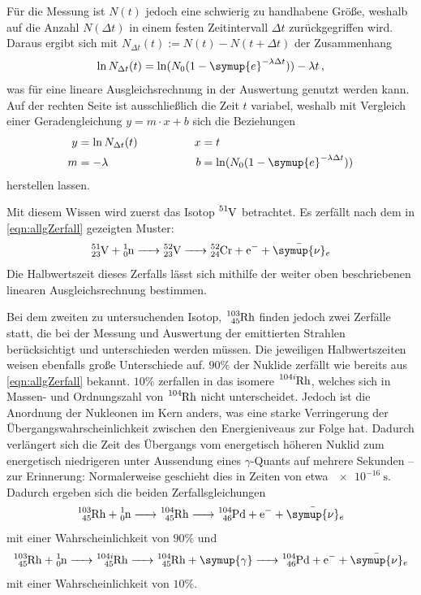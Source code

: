 Für die Messung ist $N(t)$ jedoch eine schwierig zu handhabene Größe, weshalb auf die Anzahl $N(\Delta t)$ in einem festen Zeitintervall $\Delta t$ zurückgegriffen wird. 
Daraus ergibt sich mit ${N_{\Delta t}(t) := N(t)-N(t+\Delta t)}$ der Zusammenhang
\begin{equation}
    \ln N_{\Delta t}(t) = \ln (N_0 (1-\symup{e}^{-\lambda \Delta t})) - \lambda t \,,
    \label{eqn:linRegr}
\end{equation}
was für eine lineare Ausgleichsrechnung in der Auswertung genutzt werden kann. 
Auf der rechten Seite ist ausschließlich die Zeit $t$ variabel, weshalb mit Vergleich einer Geradengleichung $y=m\cdot x +b$ sich die Beziehungen 
\begin{align*}
    y&=\ln N_{\Delta t}(t) &\qquad \qquad x&=t \\
    m&=- \lambda & \qquad \qquad b&=\ln (N_0 (1-\symup{e}^{-\lambda \Delta t}))
\end{align*}
herstellen lassen.

Mit diesem Wissen wird zuerst das Isotop $\ce{^{51}V}$ betrachtet. Es zerfällt nach dem in \eqref{eqn:allgZerfall} gezeigten Muster:
\begin{equation*}
    \ce{^{51}_{23}V + ^1_0n -> ^{52}_{23}V -> ^{52}_{24}Cr + e- + \bar{\symup{\nu}}_e}
\end{equation*}
Die Halbwertszeit dieses Zerfalls lässt sich mithilfe der weiter oben beschriebenen linearen Ausgleichsrechnung bestimmen. 

Bei dem zweiten zu untersuchenden Isotop, $\ce{^{103}_{45}Rh}$ finden jedoch zwei Zerfälle statt, die bei der Messung und 
Auswertung der emittierten Strahlen berücksichtigt und unterschieden werden müssen. Die jeweiligen Halbwertszeiten weisen ebenfalls große Unterschiede auf.  
$90\%$ der Nuklide zerfällt wie bereits aus \eqref{eqn:allgZerfall} bekannt. $10\%$ zerfallen in das isomere $\ce{^{104i}Rh}$, 
welches sich in Massen- und Ordnungszahl von $\ce{^{104}Rh}$ nicht unterscheidet. 
Jedoch ist die Anordnung der Nukleonen im Kern anders, was eine starke Verringerung der Übergangswahrscheinlichkeit zwischen den 
Energieniveaus zur Folge hat. 
Dadurch verlängert sich die Zeit des Übergangs vom energetisch höheren Nuklid zum energetisch niedrigeren unter Aussendung eines 
$\gamma$-Quants auf mehrere Sekunden -- zur Erinnerung: Normalerweise geschieht dies in Zeiten von etwa $\SI{e-16}{\second}$. 
Dadurch ergeben sich die beiden Zerfallsgleichungen
\begin{equation}
    \ce{^{103}_{45}Rh + ^1_0n -> ^{104}_{45}Rh -> ^{104}_{46}Pd + e- + \bar{\symup{\nu}}_e}
\end{equation}
mit einer Wahrscheinlichkeit von $90\%$ und 
\begin{equation}
    \ce{^{103}_{45}Rh + ^1_0n -> ^{104i}_{45}Rh -> ^{104}_{45}Rh + \symup{\gamma} -> ^{104}_{46}Pd + e- + \bar{\symup{\nu}}_e}
\end{equation}
mit einer Wahrscheinlichkeit von $10\%$.

